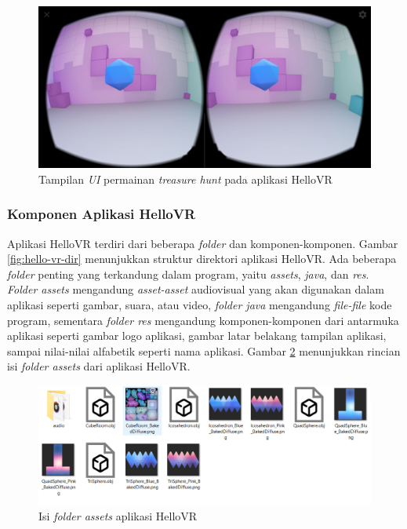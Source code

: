 \begin{figure}[h]
	\centering
		\includegraphics[width=6in]{Gambar/treasure_hunt.jpg}
	\caption{Tampilan \textit{UI} permainan \textit{treasure hunt} pada aplikasi HelloVR}
	\label{fig:treasure-hunt}
\end{figure}

\subsubsection{Komponen Aplikasi HelloVR}
Aplikasi HelloVR terdiri dari beberapa \textit{folder} dan komponen-komponen. Gambar \ref{fig:hello-vr-dir} menunjukkan struktur direktori aplikasi HelloVR. Ada beberapa \textit{folder} penting yang terkandung dalam program, yaitu \textit{assets}, \textit{java}, dan \textit{res}. \textit{Folder assets} mengandung \textit{asset-asset} audiovisual yang akan digunakan dalam aplikasi seperti gambar, suara, atau video, \textit{folder java} mengandung \textit{file-file} kode program, sementara \textit{folder res} mengandung komponen-komponen dari antarmuka aplikasi seperti gambar logo aplikasi, gambar latar belakang tampilan aplikasi, sampai nilai-nilai alfabetik seperti nama aplikasi. Gambar \ref{fig:assets-folder} menunjukkan rincian isi \textit{folder assets} dari aplikasi HelloVR. 

\begin{figure}[h]
	\centering
		\includegraphics[scale=0.7]{Gambar/assets-folder.png}
	\caption{Isi \textit{folder assets} aplikasi HelloVR}
	\label{fig:assets-folder}
\end{figure}

